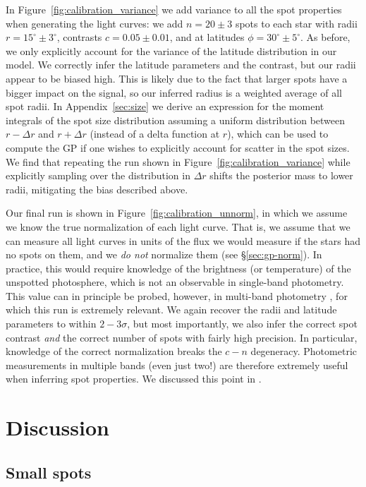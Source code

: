 \documentclass[modern,linenumbers]{aastex62}
\begin{document}
In Figure~\ref{fig:calibration_variance} we add variance to all the spot
properties when generating the light curves: we add $n = 20 \pm 3$ spots
to each star with radii $r = 15^\circ \pm 3^\circ$, contrasts
$c = 0.05 \pm 0.01$, and at latitudes $\phi = 30^\circ \pm 5^\circ$.
As before, we only explicitly account for the variance of the latitude distribution in our
model. We correctly infer the latitude parameters and the contrast, but
our radii appear to be biased high. This is likely due to the fact that
larger spots have a bigger impact on the signal, so our inferred radius
is a weighted average of all spot radii. In Appendix~\ref{sec:size} we
derive an expression for the moment integrals of the spot size distribution
assuming a uniform distribution between $r - \Delta r$ and $r + \Delta r$
(instead of a delta function at $r$), which can be used to compute the
GP if one wishes to explicitly account for scatter in the spot sizes.
We find that repeating the run shown in Figure~\ref{fig:calibration_variance}
while explicitly sampling over the distribution in $\Delta r$ shifts the
posterior mass to lower radii, mitigating the bias described above.

Our final run is shown in Figure~\ref{fig:calibration_unnorm}, in which
we assume we know the true normalization of each light curve. That is, we
assume that we can measure all light curves in units of the flux we would
measure if the stars had no spots on them, and we \emph{do not}
normalize them (see \S\ref{sec:gp-norm}). In practice, this would require
knowledge of the brightness (or temperature) of the unspotted
photosphere, which is not an observable in single-band photometry.
This value can in principle be probed, however, in multi-band photometry
\citep[e.g.,][]{Gully2017,Guo2018}, for which this run is
extremely relevant. We again recover the radii and latitude parameters
to within $2-3\sigma$, but most importantly, we also infer the correct
spot contrast \emph{and} the correct number of spots with fairly high
precision. In particular, knowledge of the correct normalization breaks the $c-n$ degeneracy.
Photometric measurements in multiple bands (even just two!)
are therefore extremely useful when inferring spot properties.
We discussed this point in .

\section{Discussion}
\label{sec:discussion}

\subsection{Small spots}
\label{sec:tinyspots}
\end{document}
